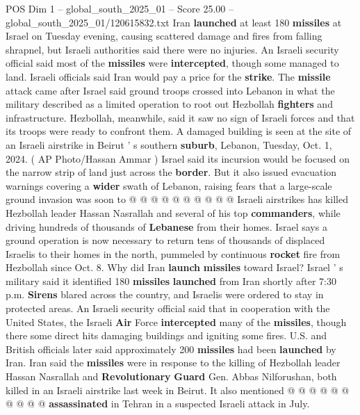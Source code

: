\begin{textsample}{POS Dim 1 – global\_south\_2025\_01 – Score 25.00 – global\_south\_2025\_01/120615832.txt}  \label{ex:f1_pos_304}
Iran \textbf{launched} at least 180 \textbf{missiles} at Israel on Tuesday evening, causing scattered damage and fires from falling shrapnel, but Israeli authorities said there were no injuries.
An Israeli security official said most of the \textbf{missiles} were \textbf{intercepted}, though some managed to land.
Israeli officials said Iran would pay a price for the \textbf{strike}.
The \textbf{missile} attack came after Israel said ground troops crossed into Lebanon in what the military described as a limited operation to root out Hezbollah \textbf{fighters} and infrastructure.
Hezbollah, meanwhile, said it saw no sign of Israeli forces and that its troops were ready to confront them.
A damaged building is seen at the site of an Israeli airstrike in Beirut ' s southern \textbf{suburb}, Lebanon, Tuesday, Oct. 1, 2024. ( AP Photo/Hassan Ammar ) Israel said its incursion would be focused on the narrow strip of land just across the \textbf{border}.
But it also issued evacuation warnings covering a \textbf{wider} swath of Lebanon, raising fears that a large-scale ground invasion was soon to @ @ @ @ @ @ @ @ @ @ Israeli airstrikes has killed Hezbollah leader Hassan Nasrallah and several of his top \textbf{commanders}, while driving hundreds of thousands of \textbf{Lebanese} from their homes.
Israel says a ground operation is now necessary to return tens of thousands of displaced Israelis to their homes in the north, pummeled by continuous \textbf{rocket} fire from Hezbollah since Oct. 8.
Why did Iran \textbf{launch} \textbf{missiles} toward Israel?
Israel ' s military said it identified 180 \textbf{missiles} \textbf{launched} from Iran shortly after 7:30 p.m. \textbf{Sirens} blared across the country, and Israelis were ordered to stay in protected areas.
An Israeli security official said that in cooperation with the United States, the Israeli \textbf{Air} Force \textbf{intercepted} many of the \textbf{missiles}, though there some direct hits damaging buildings and igniting some fires.
U.S. and British officials later said approximately 200 \textbf{missiles} had been \textbf{launched} by Iran.
Iran said the \textbf{missiles} were in response to the killing of Hezbollah leader Hassan Nasrallah and \textbf{Revolutionary} \textbf{Guard} Gen.
Abbas Nilforushan, both killed in an Israeli airstrike last week in Beirut.
It also mentioned @ @ @ @ @ @ @ @ @ @ \textbf{assassinated} in Tehran in a suspected Israeli attack in July.

\end{textsample}

